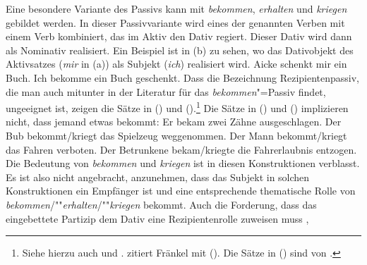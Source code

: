 %

Eine besondere Variante des Passivs kann mit \emph{bekommen},
\emph{erhalten} und \emph{kriegen}
gebildet werden. In dieser Passivvariante wird eines der genannten Verben
mit einem Verb kombiniert, das im Aktiv den Dativ regiert. Dieser Dativ wird dann
als Nominativ realisiert. Ein Beispiel ist in (b) zu sehen, wo
das Dativobjekt des Aktivsatzes (\emph{mir} in (a)) als Subjekt (\emph{ich})
realisiert wird.
\eal
\ex{}
Aicke schenkt mir      ein Buch.
\ex\label{ex-ich-bekommen-ein-buch-geschenkt} 
Ich     bekomme ein Buch       geschenkt.
\zl
Dass die Bezeichnung Rezipientenpassiv, die man auch mitunter in der 
Literatur für das \emph{bekommen}"=Passiv findet,
ungeeignet ist, zeigen die Sätze in () und ().\footnote{
        Siehe hierzu auch  
        und . 
        \citet*[]{Eroms78} zitiert Fränkel %
        mit (). %
        Die Sätze in () sind von \citet*[]{Reis76a}.
}
Die Sätze in () und () implizieren nicht, dass jemand etwas bekommt:
\ea{}
\label{bsp-zaehne-ausgeschlagen}
Er bekam zwei Zähne ausgeschlagen.
\z
\eal
\label{bsp-bekommen-passiv-mit-akk}
\ex
Der Bub bekommt/kriegt das Spielzeug weggenommen.
\ex{}
Der Mann bekommt/kriegt das Fahren  verboten.
\ex{}
Der Betrunkene bekam/kriegte die Fahrerlaubnis     entzogen.
\zl
Die Bedeutung von \emph{bekommen} und \emph{kriegen} ist in diesen
Konstruktionen verblasst. Es ist also nicht angebracht, anzunehmen,
dass das Subjekt in solchen Konstruktionen ein Empfänger ist und
eine entsprechende thematische Rolle von \emph{bekommen}/""\emph{erhalten}/""\emph{kriegen}
bekommt. Auch die Forderung, dass das eingebettete Partizip dem
Dativ eine Rezipientenrolle zuweisen muss \citep[]{Gunkel2003b},
